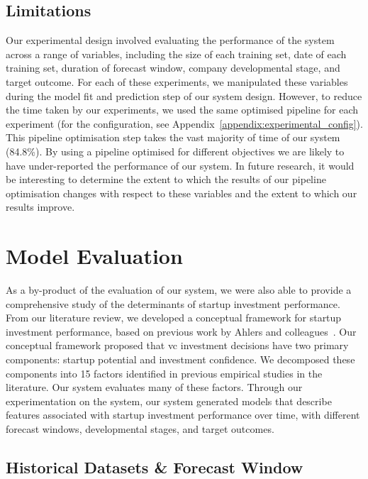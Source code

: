 \documentclass[../thesis/thesis.tex]{subfiles}
\begin{document}
\subsection{Limitations}

Our experimental design involved evaluating the performance of the system across a range of variables, including the size of each training set, date of each training set, duration of forecast window, company developmental stage, and target outcome. For each of these experiments, we manipulated these variables during the model fit and prediction step of our system design. However, to reduce the time taken by our experiments, we used the same optimised pipeline for each experiment (for the configuration, see Appendix~\ref{appendix:experimental_config}). This pipeline optimisation step takes the vast majority of time of our system (84.8\%). By using a pipeline optimised for different objectives we are likely to have under-reported the performance of our system. In future research, it would be interesting to determine the extent to which the results of our pipeline optimisation changes with respect to these variables and the extent to which our results improve.

\section{Model Evaluation}

As a by-product of the evaluation of our system, we were also able to provide a comprehensive study of the determinants of startup investment performance. From our literature review, we developed a conceptual framework for startup investment performance, based on previous work by Ahlers and colleagues~\cite{ahlers2015}. Our conceptual framework proposed that \gls{vc} investment decisions have two primary components: startup potential and investment confidence. We decomposed these components into 15 factors identified in previous empirical studies in the literature. Our system evaluates many of these factors. Through our experimentation on the system, our system generated models that describe features associated with startup investment performance over time, with different forecast windows, developmental stages, and target outcomes.

\subsection{Historical Datasets \& Forecast Window}
\end{document}
